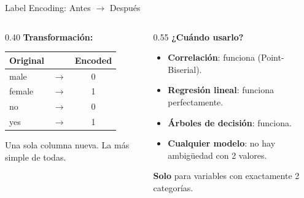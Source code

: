 \documentclass[aspectratio=169, 11pt]{beamer}
\begin{document}
\begin{frame}[shrink=5]{Label Encoding: Antes $\to$ Después}
  \vspace{-4pt}
  \begin{columns}[T]
    \begin{column}{0.40\textwidth}
      {\footnotesize\bfseries\color{arcaDark} Transformación:}
      \vspace{4pt}

      {\scriptsize
      \begin{tabular}{@{}lcc@{}}
        \toprule
        \textbf{Original} & & \textbf{Encoded} \\
        \midrule
        male & $\to$ & 0 \\
        female & $\to$ & 1 \\
        \midrule
        no & $\to$ & 0 \\
        yes & $\to$ & 1 \\
        \bottomrule
      \end{tabular}
      }

      \vspace{8pt}
      {\scriptsize\color{arcaDark}
        \faLightbulb\hspace{4pt}
        Una sola columna nueva.
        La más simple de todas.}
    \end{column}

    \begin{column}{0.55\textwidth}
      {\footnotesize\bfseries\color{arcaDark} ¿Cuándo usarlo?}
      \vspace{4pt}

      {\scriptsize
      \begin{itemize}\setlength{\itemsep}{4pt}
        \item[{\color{codeGreen}\faCheckCircle}]
          \textbf{Correlación}: funciona (Point-Biserial).
        \item[{\color{codeGreen}\faCheckCircle}]
          \textbf{Regresión lineal}: funciona perfectamente.
        \item[{\color{codeGreen}\faCheckCircle}]
          \textbf{Árboles de decisión}: funciona.
        \item[{\color{codeGreen}\faCheckCircle}]
          \textbf{Cualquier modelo}: no hay ambigüedad con 2 valores.
      \end{itemize}
      }

      \vspace{4pt}
      {\scriptsize\color{arcaRed}
        \faExclamationTriangle\hspace{4pt}
        \textbf{Solo} para variables con exactamente 2 categorías.}
    \end{column}
  \end{columns}
\end{frame}
\end{document}
